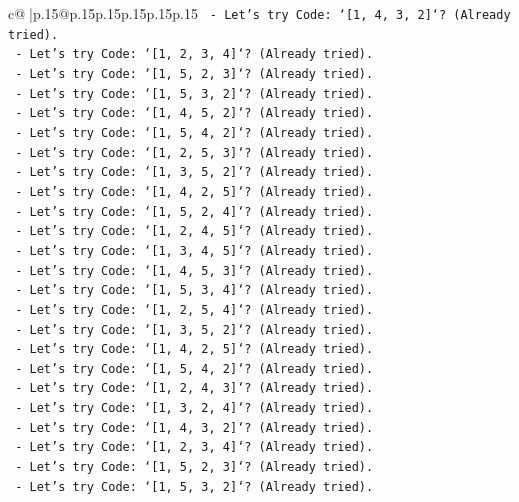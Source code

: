 \documentclass{article}
\begin{document}
{\begin{supertabular}{c@{$\;$}|p{.15\linewidth}@{}p{.15\linewidth}p{.15\linewidth}p{.15\linewidth}p{.15\linewidth}p{.15\linewidth}}
{{{\texttt{    {-} Let's try Code: `{[}1, 4, 3, 2{]}`? (Already tried).} \\
\texttt{    {-} Let's try Code: `{[}1, 2, 3, 4{]}`? (Already tried).} \\
\texttt{    {-} Let's try Code: `{[}1, 5, 2, 3{]}`? (Already tried).} \\
\texttt{    {-} Let's try Code: `{[}1, 5, 3, 2{]}`? (Already tried).} \\
\texttt{    {-} Let's try Code: `{[}1, 4, 5, 2{]}`? (Already tried).} \\
\texttt{    {-} Let's try Code: `{[}1, 5, 4, 2{]}`? (Already tried).} \\
\texttt{    {-} Let's try Code: `{[}1, 2, 5, 3{]}`? (Already tried).} \\
\texttt{    {-} Let's try Code: `{[}1, 3, 5, 2{]}`? (Already tried).} \\
\texttt{    {-} Let's try Code: `{[}1, 4, 2, 5{]}`? (Already tried).} \\
\texttt{    {-} Let's try Code: `{[}1, 5, 2, 4{]}`? (Already tried).} \\
\texttt{    {-} Let's try Code: `{[}1, 2, 4, 5{]}`? (Already tried).} \\
\texttt{    {-} Let's try Code: `{[}1, 3, 4, 5{]}`? (Already tried).} \\
\texttt{    {-} Let's try Code: `{[}1, 4, 5, 3{]}`? (Already tried).} \\
\texttt{    {-} Let's try Code: `{[}1, 5, 3, 4{]}`? (Already tried).} \\
\texttt{    {-} Let's try Code: `{[}1, 2, 5, 4{]}`? (Already tried).} \\
\texttt{    {-} Let's try Code: `{[}1, 3, 5, 2{]}`? (Already tried).} \\
\texttt{    {-} Let's try Code: `{[}1, 4, 2, 5{]}`? (Already tried).} \\
\texttt{    {-} Let's try Code: `{[}1, 5, 4, 2{]}`? (Already tried).} \\
\texttt{    {-} Let's try Code: `{[}1, 2, 4, 3{]}`? (Already tried).} \\
\texttt{    {-} Let's try Code: `{[}1, 3, 2, 4{]}`? (Already tried).} \\
\texttt{    {-} Let's try Code: `{[}1, 4, 3, 2{]}`? (Already tried).} \\
\texttt{    {-} Let's try Code: `{[}1, 2, 3, 4{]}`? (Already tried).} \\
\texttt{    {-} Let's try Code: `{[}1, 5, 2, 3{]}`? (Already tried).} \\
\texttt{    {-} Let's try Code: `{[}1, 5, 3, 2{]}`? (Already tried).} \\
}}}
\end{supertabular}}
\end{document}
